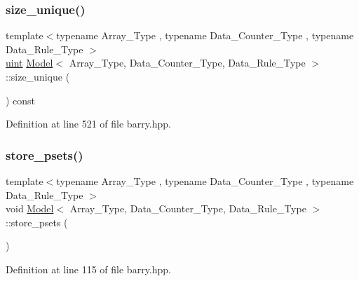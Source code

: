 \mbox{\label{classbarry_1_1_model_a4b5edbe891b6da2319ea3fa6f1aba11d}} 
\subsubsection{\texorpdfstring{size\+\_\+unique()}{size\_unique()}}
{\footnotesize\ttfamily template$<$typename Array\+\_\+\+Type , typename Data\+\_\+\+Counter\+\_\+\+Type , typename Data\+\_\+\+Rule\+\_\+\+Type $>$ \\
\hyperlink{namespacebarry_a11dfc53ddb4672278319aa04f1e09a6c}{uint} \hyperlink{classbarry_1_1_model}{Model}$<$ Array\+\_\+\+Type, Data\+\_\+\+Counter\+\_\+\+Type, Data\+\_\+\+Rule\+\_\+\+Type $>$\+::size\+\_\+unique (\begin{DoxyParamCaption}{ }\end{DoxyParamCaption}) const\hspace{0.3cm}{\ttfamily [inline]}}



Definition at line 521 of file barry.\+hpp.

\mbox{\label{classbarry_1_1_model_a06a6f52dfc6868908cf11e6663a93904}} 
\subsubsection{\texorpdfstring{store\+\_\+psets()}{store\_psets()}}
{\footnotesize\ttfamily template$<$typename Array\+\_\+\+Type , typename Data\+\_\+\+Counter\+\_\+\+Type , typename Data\+\_\+\+Rule\+\_\+\+Type $>$ \\
void \hyperlink{classbarry_1_1_model}{Model}$<$ Array\+\_\+\+Type, Data\+\_\+\+Counter\+\_\+\+Type, Data\+\_\+\+Rule\+\_\+\+Type $>$\+::store\+\_\+psets (\begin{DoxyParamCaption}{ }\end{DoxyParamCaption})\hspace{0.3cm}{\ttfamily [inline]}}



Definition at line 115 of file barry.\+hpp.



